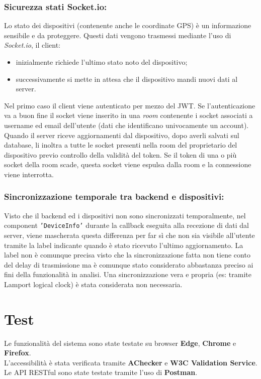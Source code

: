 \documentclass{report}
\begin{document}
\subsubsection{Sicurezza stati Socket.io:}
Lo stato dei dispositivi (contenente anche le coordinate GPS) è un informazione sensibile e da proteggere. Questi dati vengono trasmessi mediante l'uso di \textit{Socket.io}, il client:
\begin{itemize}
    \item inizialmente richiede l'ultimo stato noto del dispositivo;
    \item successivamente si mette in attesa che il dispositivo mandi nuovi dati al server.
\end{itemize}
Nel primo caso il client viene autenticato per mezzo del JWT. Se l'autenticazione va a buon fine il socket viene inserito in una \textit{room} contenente i socket associati a username ed email dell'utente (dati che identificano univocamente un account).\\
Quando il server riceve aggiornamenti dal dispositivo, dopo averli salvati sul database, li inoltra a tutte le socket presenti nella room del proprietario del dispositivo previo controllo della validità del token. Se il token di una o più socket della room scade, questa socket viene espulsa dalla room e la connessione viene interrotta.\\
\subsubsection{Sincronizzazione temporale tra backend e dispositivi:}
Visto che il backend ed i dispositivi non sono sincronizzati temporalmente, nel component  \texttt{'DeviceInfo'} durante la callback eseguita alla recezione di dati dal server,  viene mascherata questa differenza per far sì che non sia visibile all'utente tramite la label indicante quando è stato ricevuto l'ultimo aggiornamento. La label non è comunque precisa visto che la sincronizzazione fatta non tiene conto del delay di trasmissione ma è comunque stato considerato abbastanza preciso ai fini della funzionalità in analisi. Una sincronizzazione vera e propria (es: tramite Lamport logical clock) è stata considerata non necessaria.


\section{Test}
Le funzionalità del sistema sono state testate su browser \textbf{Edge}, \textbf{Chrome} e \textbf{Firefox}.\\
L'accessibilità è stata verificata tramite \textbf{AChecker} e \textbf{W3C Validation Service}.\\
Le API RESTful sono state testate tramite l'uso di \textbf{Postman}.
\end{document}

